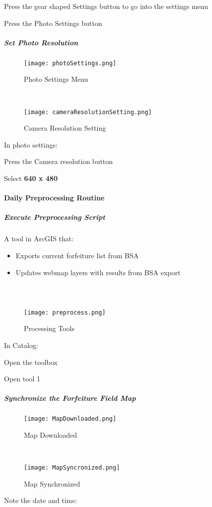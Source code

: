 \noindent Press the gear shaped \Large Settings \normalsize button to go into the settings menu
\vspace{3in}

\noindent Press the \Large Photo Settings \normalsize button
\clearpage
\subparagraph*{Set Photo Resolution}
\begin{wrapfigure}{r}{0.5\textwidth}
\centering
    \texttt{[image: photoSettings.png]}
\caption{Photo Settings Menu}
\vspace{.25in}

\HRule \\[.4cm] %
\vspace{.25in}

    \texttt{[image: cameraResolutionSetting.png]}
\caption{Camera Resolution Setting}
\end{wrapfigure}
In \Large photo settings:
\vspace{1in}

\noindent Press the \Large Camera resolution \normalsize button
\vspace{3in}

\noindent Select \textbf{\LARGE 640 x 480}
\clearpage
\paragraph{Daily Preprocessing Routine}
\subparagraph{Execute Preprocessing Script}A tool in ArcGIS that:
\begin{itemize}
\item Exports current forfeiture list from BSA
\item Updates webmap layers with results from BSA export
\end{itemize}
\subparagraph*{\\}
%
%
\begin{wrapfigure}{r}{0.75\textwidth}
\centering
    \texttt{[image: preprocess.png]}
\caption{Processing Tools}
\end{wrapfigure}
In Catalog:
\vspace{1in}

\noindent Open the toolbox
\vspace{1in}

\noindent Open tool 1
\clearpage
\subparagraph[Synchronize the Forfeiture Field Map]{\Large Synchronize the Forfeiture Field Map}
\begin{wrapfigure}{r}{0.5\textwidth}
\centering
    \texttt{[image: MapDownloaded.png]}
\caption{Map Downloaded}
\vspace{.25in}

\HRule \\[.4cm] %
\vspace{.25in}

    \texttt{[image: MapSyncronized.png]}
\caption{Map Synchronized}
\end{wrapfigure}
Note the date and time:
\vspace{1.5in}


